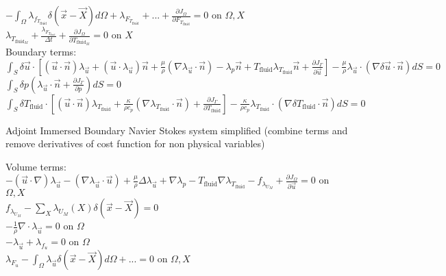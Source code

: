 \documentclass[10pt]{article} %
\begin{document}
\begin{center}
	$-\int_{\Omega} \lambda_{f_{T_{\text{fluid}}}} \delta (\vec{x}-\vec{X}) d\Omega + \lambda_{F_{T_{\text{fluid}}}} + ... + \frac{\partial J_{\Omega}}{\partial F_{T_{\text{fluid}}}}= 0$ \quad on $\Omega, X$\\
	$\lambda_{T_{\text{fluid}_M}} + \frac{\lambda_{F_{T_{\text{fluid}}}}}{\Delta t} + \frac{\partial J_{\Omega}}{\partial T_{\text{fluid}_M}} = 0$ \quad on $X$\\
	$ $\\
Boundary terms:\\
	$\int_{S} \delta \vec{u} \cdot \left[ \left(\vec{u}\cdot \vec{n}\right) \lambda_{\vec{u}} + \left(\vec{u}\cdot \lambda_{\vec{u}}\right)\vec{n} + \frac{\mu}{\rho} \left(\nabla \lambda_{\vec{u}} \cdot \vec{n}\right) -\lambda_p \vec{n} + T_{\text{fluid}} \lambda_{T_{\text{fluid}}} \vec{n} + \frac{\partial J_{\Gamma}}{\partial \vec{u}}\right] - \frac{\mu}{\rho} \lambda_{\vec{u}} \cdot \left(\nabla \delta \vec{u} \cdot \vec{n}\right) dS = 0 $\\
	$\int_{S} \delta p \left(\lambda_{\vec{u}} \cdot \vec{n} + \frac{\partial J_{\Gamma}}{\partial p} \right)dS=0$\\
	$\int_{S} \delta T_{\text{fluid}} \cdot \left[\left(\vec{u}\cdot \vec{n}\right) \lambda_{T_{\text{fluid}}}  + \frac{\kappa}{\rho c_p} \left(\nabla \lambda_{T_{\text{fluid}}} \cdot \vec{n}\right) + \frac{\partial J_{\Gamma}}{\partial T_{\text{fluid}}} \right]- \frac{\kappa}{\rho c_p} \lambda_{T_{\text{fluid}}} \cdot \left(\nabla \delta T_{\text{fluid}} \cdot \vec{n}\right) dS=0$
\begin{flushleft}
	Adjoint Immersed Boundary Navier Stokes system simplified (combine terms and remove derivatives of cost function for non physical variables)
\end{flushleft}
Volume terms:\\
	$-(\vec{u}\cdot\nabla) \lambda_{\vec{u}} - \left(\nabla \lambda_{\vec{u}} \cdot \vec{u}\right) + \frac{\mu}{\rho} \Delta \lambda_{\vec{u}} + \nabla\lambda_p - T_{\text{fluid}} \nabla \lambda_{T_{\text{fluid}}} - f_{\lambda_{U_M}} + \frac{\partial J_{\Omega}}{\partial \vec{u}} = 0$ \quad on $\Omega,X$\\
	$f_{\lambda_{U_M}} - \sum_X \lambda_{U_M}(X) \delta(\vec{x}-\vec{X}) = 0$\\
	$-\frac{1}{\rho} \nabla \cdot \lambda_{\vec{u}} = 0$ \quad on $\Omega$\\
	$-\lambda_{\vec{u}} + \lambda_{f_u} = 0$ \quad on $\Omega$\\
	$\lambda_{F_u} - \int_{\Omega} \lambda_{\vec{u}} \delta (\vec{x}-\vec{X}) d\Omega + ... = 0$ \quad on $\Omega,X$\\

\end{center}
\end{document}

